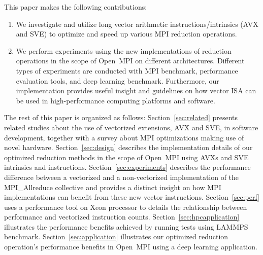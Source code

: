 \documentclass[5p,times,twocolumn]{elsarticle}
\newcommand{\ompi}[0]{Open~MPI\xspace}
\newcommand{\mpi}[0]{\textsc{MPI}\xspace}
\newcommand{\sve}[0]{\textsc{SVE}\xspace}
\newcommand{\allreduce}[0]{MPI_Allreduce\xspace}
\begin{document}
This paper makes the following contributions:
\begin{enumerate}
  \item We investigate and utilize long vector arithmetic instructions/intrinsics (AVX and SVE) to optimize and
  speed up various \mpi reduction operations.
%
  \item We perform experiments using the new implementations of reduction operations in the scope
  of \ompi on different architectures. Different types of
  experiments are conducted with \mpi benchmark, performance evaluation tools, and
  deep learning benchmark.
  Furthermore, our implementation provides useful insight and guidelines on how vector
  ISA can be used in high-performance computing platforms and software.
\end{enumerate}

The rest of this paper is organized as follows:
Section~\ref{sec:related} presents related studies about the use of vectorized extensions, AVX and \sve, in software development, together with a survey about \mpi optimizations making use of novel hardware.
Section~\ref{sec:design} describes the implementation details of our optimized reduction methods
in the scope of \ompi using AVXs and SVE intrinsics and instructions.
Section~\ref{sec:experiments} describes the performance difference between
a vectorized and a non-vectorized implementation of the \allreduce collective and provides a distinct insight on how MPI implementations can benefit from these new vector instructions.
Section~\ref{sec:perf} uses a performance tool on Xeon processor to details the relationship between performance and vectorized instruction counts.
Section~\ref{sec:hpcapplication} illustrates the performance benefits achieved by running tests using LAMMPS benchmark.
Section~\ref{sec:application} illustrates our optimized reduction operation's performance
benefits in \ompi using a deep learning application.
\end{document}
